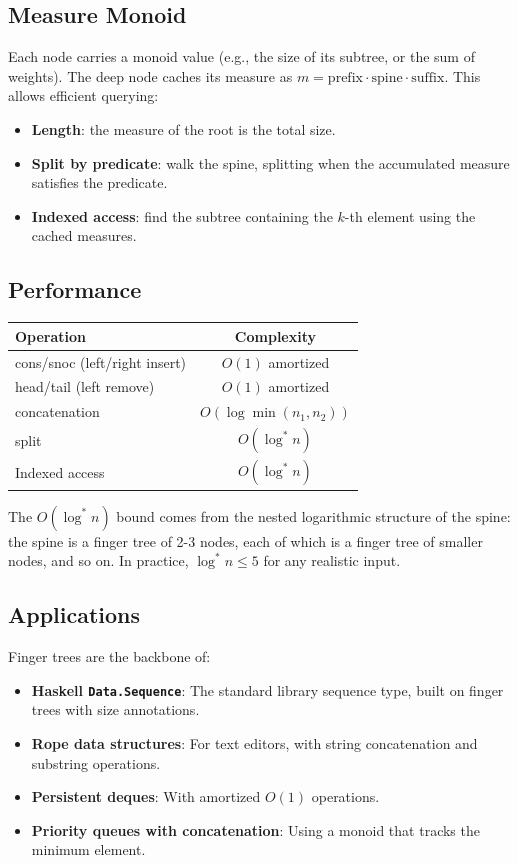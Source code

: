 \subsection{Measure Monoid}
\label{sec:finger-measure}

Each node carries a monoid value (e.g., the size of its subtree, or the sum of weights). The deep node caches its measure as $m = \text{prefix} \cdot \text{spine} \cdot \text{suffix}$. This allows efficient querying:
\begin{itemize}
    \item \textbf{Length}: the measure of the root is the total size.
    \item \textbf{Split by predicate}: walk the spine, splitting when the accumulated measure satisfies the predicate.
    \item \textbf{Indexed access}: find the subtree containing the $k$-th element using the cached measures.
\end{itemize}

\subsection{Performance}
\label{sec:finger-perf}

\begin{center}
\begin{tabular}{lc}
\toprule
Operation & Complexity \\
\midrule
cons/snoc (left/right insert) & $O(1)$ amortized \\
head/tail (left remove) & $O(1)$ amortized \\
concatenation & $O(\log \min(n_1, n_2))$ \\
split & $O(\log^* n)$ \\
Indexed access & $O(\log^* n)$ \\
\bottomrule
\end{tabular}
\end{center}

The $O(\log^* n)$ bound comes from the nested logarithmic structure of the spine: the spine is a finger tree of 2-3 nodes, each of which is a finger tree of smaller nodes, and so on. In practice, $\log^* n \leq 5$ for any realistic input.

\subsection{Applications}
\label{sec:finger-applications}

Finger trees are the backbone of:
\begin{itemize}
    \item \textbf{Haskell \texttt{Data.Sequence}}: The standard library sequence type, built on finger trees with size annotations.
    \item \textbf{Rope data structures}: For text editors, with string concatenation and substring operations.
    \item \textbf{Persistent deques}: With amortized $O(1)$ operations.
    \item \textbf{Priority queues with concatenation}: Using a monoid that tracks the minimum element.
\end{itemize}

